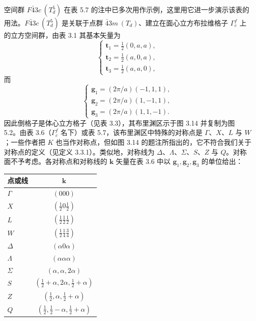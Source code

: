 空间群 $F\bar{4}3c\ (T^{5}_{d})$ 在表 5.7 的注中已多次用作示例，这里用它进一步演示该表的用法。$F\bar{4}3c\ (T^{5}_{d})$ 是关联于点群 $\bar{4}3m\ (T_{d})$、建立在面心立方布拉维格子 $\Gamma^{f}_{c}$ 上的立方空间群，由表 3.1 其基本矢量为
\begin{equation*}
\left\{
\begin{array}{l}
\mathbf{t}_{1} = \frac{1}{2}(0, a, a),\\
\mathbf{t}_{2} = \frac{1}{2}(a, 0, a),\\
\mathbf{t}_{3} = \frac{1}{2}(a, a, 0),
\end{array}
\right.
\tag{5.4.1}
\end{equation*}
而
\begin{equation*}
\left\{
\begin{array}{l}
\mathbf{g}_{1} = (2\pi/a)(-1, 1, 1),\\
\mathbf{g}_{2} = (2\pi/a)(1, -1, 1),\\
\mathbf{g}_{3} = (2\pi/a)(1, 1, -1).
\end{array}
\right.
\tag{5.4.2}
\end{equation*}
因此倒格子是体心立方格子（见表 3.3），其布里渊区示于图 3.14 并复制为图 5.2。由表 3.6（$\Gamma^{f}_{c}$ 名下）或表 5.7，该布里渊区中特殊的对称点是 $\Gamma$、$X$、$L$ 与 $W$；一些作者把 $K$ 也当作对称点，但如图 3.14 的题注所指出的，它不符合我们关于对称点的定义（见定义 3.3.1）。类似地，对称线为 $\Delta$、$\Lambda$、$\Sigma$、$S$、$Z$ 与 $Q$。对称面不予考虑。各对称点和对称线的 $\mathbf{k}$ 矢量在表 3.6 中以 $\mathbf{g}_{1}, \mathbf{g}_{2}, \mathbf{g}_{3}$ 的单位给出：
\begin{center}
\begin{tabular}{lc}
点或线 & $\mathbf{k}$\\
\midrule
$\Gamma$ & $(000)$\\
$X$ & $(\frac{1}{2}0\frac{1}{2})$\\
$L$ & $(\frac{1}{2}\frac{1}{2}\frac{1}{2})$\\
$W$ & $(\frac{1}{2}\frac{1}{4}\frac{3}{4})$\\
$\Delta$ & $(\alpha 0\alpha)$\\
$\Lambda$ & $(\alpha\alpha\alpha)$\\
$\Sigma$ & $(\alpha, \alpha, 2\alpha)$\\
$S$ & $(\frac{1}{2}+\alpha, 2\alpha, \frac{1}{2}+\alpha)$\\
$Z$ & $(\frac{1}{2}, \alpha, \frac{1}{2}+\alpha)$\\
$Q$ & $(\frac{1}{2}, \frac{1}{2}-\alpha, \frac{1}{2}+\alpha)$
\end{tabular}
\end{center}

